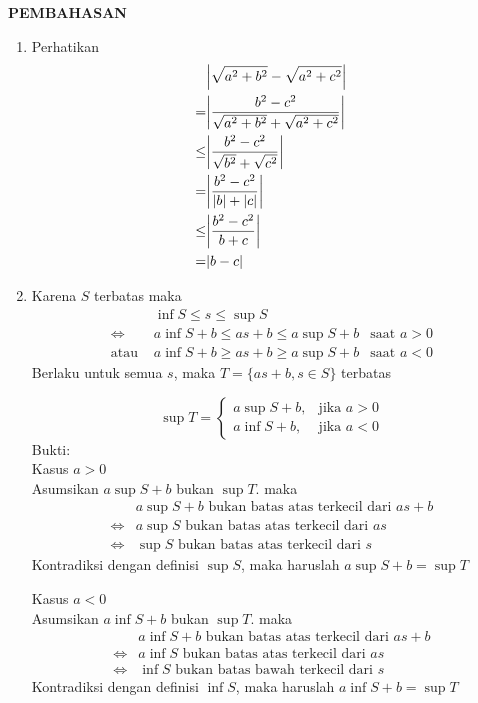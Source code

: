 \documentclass{article}
\begin{document}
\newpage
\begin{center}
\textbf{\large{PEMBAHASAN}}
\end{center}
\begin{enumerate}[leftmargin=*, label={\arabic*}.]
\item Perhatikan \begin{align*}
    &\abs*{\sqrt{a^2+b^2}-\sqrt{a^2+c^2}}\\
    =&\abs*{\frac{b^2-c^2}{\sqrt{a^2+b^2}+\sqrt{a^2+c^2}}}\\
    \leq&\abs*{\frac{b^2-c^2}{\sqrt{b^2}+\sqrt{c^2}}}\\
    =&\abs*{\frac{b^2-c^2}{\abs{b}+\abs{c}}}\\
    \leq&\abs*{\frac{b^2-c^2}{b+c}}\\
    =&\abs{b-c}
\end{align*}
\item Karena $S$ terbatas maka
\begin{align*}
    &\inf S \leq s \leq \sup S\\
    \iff &a \inf S + b \leq as+b \leq a \sup S + b &\text{saat $a>0$}\\
    \text{atau } &a \inf S + b \geq as+b \geq a \sup S + b &\text{saat $a<0$}
\end{align*}
Berlaku untuk semua $s$, maka $T=\{as+b, s\in S\}$ terbatas


\[\sup T=
\begin{cases}
    a \sup S + b, &\text{jika $a > 0$}\\
    a \inf S + b, &\text{jika $a < 0$}    
\end{cases}\]
Bukti: \\
Kasus $a > 0$\\
Asumsikan $a \sup S + b$ bukan $\sup T$. maka
\begin{align*}
    &a \sup S + b \text{ bukan batas atas terkecil dari $as+b$}\\
    \iff&a \sup S \text{ bukan batas atas terkecil dari $as$}\\
    \iff&\sup S \text{ bukan batas atas terkecil dari $s$}
\end{align*}
Kontradiksi dengan definisi $\sup S$, maka haruslah $a \sup S + b = \sup T$

Kasus $a < 0$\\
Asumsikan $a \inf S + b$ bukan $\sup T$. maka
\begin{align*}
    &a \inf S + b \text{ bukan batas atas terkecil dari $as+b$}\\
    \iff&a \inf S \text{ bukan batas atas terkecil dari $as$}\\
    \iff&\inf S \text{ bukan batas bawah terkecil dari $s$}
\end{align*}
Kontradiksi dengan definisi $\inf S$, maka haruslah $a \inf S + b = \sup T$


\end{enumerate}
\end{document}
